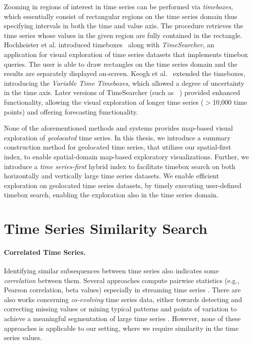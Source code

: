 Zooming in regions of interest in time series can be performed via {\em timeboxes}, which essentially consist of rectangular regions on the time series domain thus specifying intervals in both the time and value axis. The procedure retrieves the time series whose values in the given region are fully contained in the rectangle. Hochheister et al. introduced timeboxes~\cite{hochheiser2004dynamic} along with {\em TimeSearcher}, an application for visual exploration of time series datasets that implements timebox queries. The user is able to draw rectangles on the time series domain and the results are separately displayed on-screen. Keogh et al.~\cite{keogh2002augmented} extended the timeboxes, introducing the {\em Variable Time Timeboxes}, which allowed a degree of uncertainty in the time axis. Later versions of TimeSearcher (such as ~\cite{aris2005representing}) provided enhanced functionality, allowing the visual exploration of longer time series ($>$10,000 time points) and offering forecasting functionality.

None of the aforementioned methods and systems provides map-based visual exploration of {\em geolocated} time series. In this thesis, we introduce a summary construction method for geolocated time series, that utilizes our spatial-first \btsr index, to enable spatial-domain map-based exploratory visualizations. Further, we introduce a {\em time series-first} hybrid index to facilitate timebox search on both horizontally and vertically large time series datasets. We enable efficient exploration on geolocated time series datasets, by timely executing user-defined timebox search, enabling the exploration also in the time series domain.

\section{Time Series Similarity Search}
\label{sec:ts_search}

\paragraph{Correlated Time Series.} Identifying similar subsequences between time series also indicates some {\em correlation} between them. Several approaches compute pairwise statistics (e.g., Pearson correlation, beta values) especially in streaming time series \cite{zhu2002statstream,cole2005fast,papadimitriou2006local}. There are also works concerning {\em co-evolving} time series data, either towards detecting and correcting missing values \cite{yongjie2015fast} or mining typical patterns and points of variation to achieve a meaningful segmentation of large time series \cite{matsubara2014autoplait}. However, none of these approaches is applicable to our setting, where we require similarity in the time series values. 


